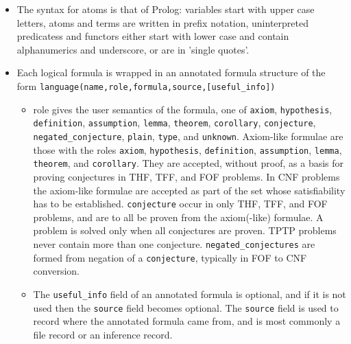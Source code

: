 \begin{itemize}
  \item The syntax for atoms is that of Prolog: variables start with upper case letters, atoms and terms are written in prefix notation, uninterpreted predicatess and functors either start with lower case and contain alphanumerics and underscore, or are in 'single quotes'.

  \item Each logical formula is wrapped in an annotated formula structure of the form  \newline \texttt{language(name,role,formula,source,[useful_info])}

    \begin{itemize}
      \item role gives the user semantics of the formula, one of
        \texttt{axiom},
        \texttt{hypothesis},
        \texttt{definition},
        \texttt{assumption},
        \texttt{lemma},
        \texttt{theorem},
        \texttt{corollary},
        \texttt{conjecture},
        \texttt{negated_conjecture},
        \texttt{plain},
        \texttt{type},
        and \texttt{unknown}.  Axiom-like formulae are those with the roles
        \texttt{axiom},
        \texttt{hypothesis},
        \texttt{definition},
        \texttt{assumption},
        \texttt{lemma},
        \texttt{theorem},
        and \texttt{corollary}. They are accepted, without proof, as a basis for proving conjectures in THF, TFF, and FOF problems. In CNF problems the axiom-like formulae are accepted as part of the set whose satisfiability has to be established. \texttt{conjecture} occur in only THF, TFF, and FOF problems, and are to all be proven from the axiom(-like) formulae. A problem is solved only when all conjectures are proven. TPTP problems never contain more than one conjecture. \texttt{negated_conjectures} are formed from negation of a \texttt{conjecture}, typically in FOF to CNF conversion.
      \item The \texttt{useful_info} field of an annotated formula is optional, and if it is not used then the \texttt{source} field becomes optional. The \texttt{source} field is used to record where the annotated formula came from, and is most commonly a file record or an inference record.
    \end{itemize}


\end{itemize}
